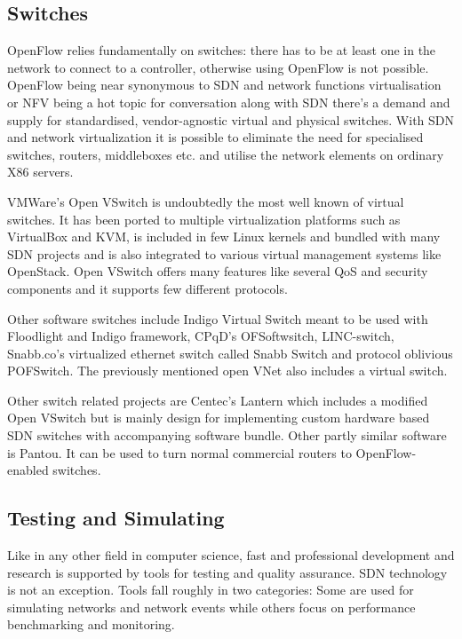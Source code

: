 \documentclass[english]{tktltiki2}
\theoremstyle{definition}
\theoremstyle{remark}
\begin{document}
\subsection{Switches}

OpenFlow relies fundamentally on switches: there has to be at least one in the network to connect to a controller, otherwise using OpenFlow is not possible. OpenFlow being near synonymous to SDN and network functions virtualisation or NFV being a hot topic for conversation along with SDN there’s a demand and supply for standardised, vendor-agnostic virtual and physical switches. With SDN and network virtualization it is possible to eliminate the need for specialised switches, routers, middleboxes etc. and utilise the network elements on ordinary X86 servers.

VMWare’s Open VSwitch is undoubtedly the most well known of virtual switches. It has been ported to multiple virtualization platforms such as VirtualBox
and KVM, is included in few Linux kernels and bundled with many SDN projects and is also integrated to various virtual management systems like OpenStack. Open VSwitch offers many features like several QoS and security components and it supports few different protocols.

Other software switches include Indigo Virtual Switch meant to be used with Floodlight and Indigo framework, CPqD’s OFSoftwsitch, LINC-switch, Snabb.co’s virtualized ethernet switch called Snabb Switch and protocol oblivious POFSwitch. The previously mentioned open VNet also includes a virtual switch. 

Other switch related projects are Centec’s Lantern which includes a modified Open VSwitch but is mainly design for implementing custom  hardware based SDN switches with accompanying software bundle. Other partly similar software is Pantou. It can be used to turn normal commercial routers to OpenFlow-enabled switches.

\subsection{Testing and Simulating}

Like in any other field in computer science, fast and professional development and research is supported by tools for testing and quality assurance. SDN technology is not an exception. Tools fall roughly in two categories: Some are used for simulating networks and network events while others focus on performance benchmarking and monitoring.
\end{document}
